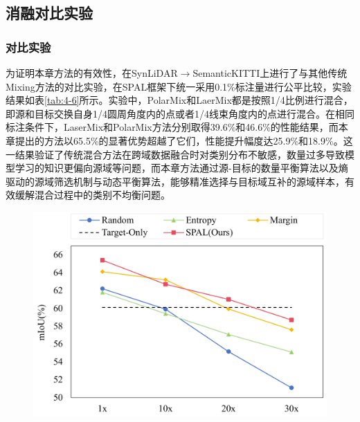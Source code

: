     \subsection{消融对比实验}
    \subsubsection{对比实验}
    
    为证明本章方法的有效性，在SynLiDAR$\to$SemanticKITTI上进行了与其他传统Mixing方法的对比实验，在SPAL框架下统一采用0.1\%标注量进行公平比较，实验结果如表\ref{tab:4-6}所示。实验中，PolarMix和LaerMix都是按照1/4比例进行混合，即源和目标交换自身1/4圆周角度内的点或者1/4线束角度内的点进行混合。在相同标注条件下，LaserMix和PolarMix方法分别取得39.6\%和46.6\%的性能结果，而本章提出的方法以65.5\%的显著优势超越了它们，性能提升幅度达25.9\%和18.9\%。这一结果验证了传统混合方法在跨域数据融合时对类别分布不敏感，数量过多导致模型学习的知识更偏向源域等问题，而本章方法通过源-目标的数量平衡算法以及熵驱动的源域筛选机制与动态平衡算法，能够精准选择与目标域互补的源域样本，有效缓解混合过程中的类别不均衡问题。%
    \vspace{-0.1cm}
    \begin{figure}[H]
        \centering
        \includegraphics[width = \textwidth]{ljx/figure/4-compare-al-mixing.pdf}
        \label{fig:4-compare-al-mixing}
    \end{figure}
